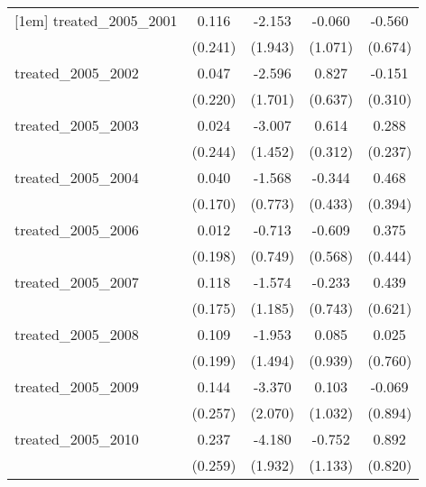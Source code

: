 {\begin{tabular}{l*{4}{c}}
[1em]
treated\_2005\_2001&       0.116         &      -2.153         &      -0.060         &      -0.560         \\
            &     (0.241)         &     (1.943)         &     (1.071)         &     (0.674)         \\
[1em]
treated\_2005\_2002&       0.047         &      -2.596         &       0.827         &      -0.151         \\
            &     (0.220)         &     (1.701)         &     (0.637)         &     (0.310)         \\
[1em]
treated\_2005\_2003&       0.024         &      -3.007\sym{*}  &       0.614\sym{*}  &       0.288         \\
            &     (0.244)         &     (1.452)         &     (0.312)         &     (0.237)         \\
[1em]
treated\_2005\_2004&       0.040         &      -1.568\sym{*}  &      -0.344         &       0.468         \\
            &     (0.170)         &     (0.773)         &     (0.433)         &     (0.394)         \\
[1em]
treated\_2005\_2006&       0.012         &      -0.713         &      -0.609         &       0.375         \\
            &     (0.198)         &     (0.749)         &     (0.568)         &     (0.444)         \\
[1em]
treated\_2005\_2007&       0.118         &      -1.574         &      -0.233         &       0.439         \\
            &     (0.175)         &     (1.185)         &     (0.743)         &     (0.621)         \\
[1em]
treated\_2005\_2008&       0.109         &      -1.953         &       0.085         &       0.025         \\
            &     (0.199)         &     (1.494)         &     (0.939)         &     (0.760)         \\
[1em]
treated\_2005\_2009&       0.144         &      -3.370         &       0.103         &      -0.069         \\
            &     (0.257)         &     (2.070)         &     (1.032)         &     (0.894)         \\
[1em]
treated\_2005\_2010&       0.237         &      -4.180\sym{*}  &      -0.752         &       0.892         \\
            &     (0.259)         &     (1.932)         &     (1.133)         &     (0.820)         \\

\end{tabular}}
